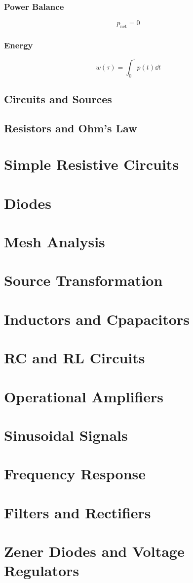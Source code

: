 \documentclass{article}
\begin{document}
\subsubsection{Power Balance}
\begin{theorem}
    \begin{equation*}
        p_{\text{net}} = 0
    \end{equation*}
\end{theorem}
\subsubsection{Energy}
\begin{theorem}
    \begin{equation*}
        w\left( \tau \right) = \int_0^\tau p\left( t \right) \dd{t}
    \end{equation*}
\end{theorem}
\subsection{Circuits and Sources}
\subsection{Resistors and Ohm's Law}
\newpage
\section{Simple Resistive Circuits}
\newpage
\section{Diodes}
\newpage
\section{Mesh Analysis}
\newpage
\section{Source Transformation}
\newpage
\section{Inductors and Cpapacitors}
\newpage
\section{RC and RL Circuits}
\newpage
\section{Operational Amplifiers}
\newpage
\section{Sinusoidal Signals}
\newpage
\section{Frequency Response}
\newpage
\section{Filters and Rectifiers}
\newpage
\section{Zener Diodes and Voltage Regulators}
\newpage
\end{document}

